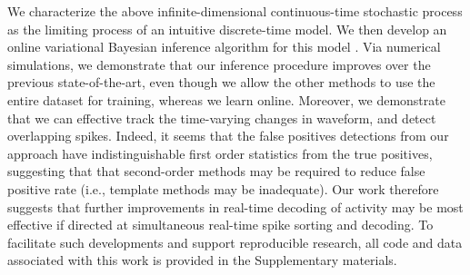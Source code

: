 We characterize the above infinite-dimensional continuous-time stochastic process as the limiting process of an intuitive discrete-time model.  
We then develop an online variational Bayesian inference algorithm for this model \cite{??}.  Via numerical simulations, we demonstrate that our inference procedure improves over the previous state-of-the-art, even though we allow the other methods to use the entire dataset for training, whereas we learn online.  Moreover, we demonstrate that we can effective track the time-varying changes in waveform, and detect overlapping spikes.  Indeed, it seems that the false positives detections from our approach have indistinguishable first order statistics from the true positives, suggesting that that second-order methods may be required to reduce false positive rate (i.e., template methods may be inadequate).  Our work therefore suggests that further improvements in real-time decoding of activity may be most effective if directed at simultaneous real-time spike sorting and decoding.  To facilitate such developments and support reproducible research, all code and data associated with this work is provided in the Supplementary materials.
